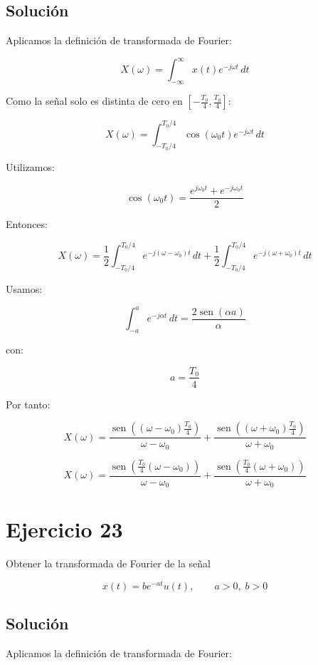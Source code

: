 \documentclass[fleqn]{article}
\DeclareMathOperator{\sen}{sen}
\begin{document}
	\subsection{Solución}

	Aplicamos la definición de transformada de Fourier:

	\[
	X(\omega)
	=
	\int_{-\infty}^{\infty}
	x(t)e^{-j\omega t}\,dt
	\]

	Como la señal solo es distinta de cero en
	$\left[-\frac{T_0}{4},\frac{T_0}{4}\right]$:

	\[
	X(\omega)
	=
	\int_{-T_0/4}^{T_0/4}
	\cos(\omega_0 t)e^{-j\omega t}\,dt
	\]

	Utilizamos:

	\[
	\cos(\omega_0 t)
	=
	\frac{
	e^{j\omega_0 t}
	+
	e^{-j\omega_0 t}
	}{2}
	\]

	Entonces:

	\[
	X(\omega)
	=
	\frac{1}{2}
	\int_{-T_0/4}^{T_0/4}
	e^{-j(\omega-\omega_0)t}\,dt
	+
	\frac{1}{2}
	\int_{-T_0/4}^{T_0/4}
	e^{-j(\omega+\omega_0)t}\,dt
	\]

	Usamos:

	\[
	\int_{-a}^{a}
	e^{-j\alpha t}\,dt
	=
	\frac{2\sen(\alpha a)}{\alpha}
	\]

	con:

	\[
	a=\frac{T_0}{4}
	\]

	Por tanto:

	\[
	X(\omega)
	=
	\frac{
	\sen\left(
	(\omega-\omega_0)\frac{T_0}{4}
	\right)
	}{
	\omega-\omega_0
	}
	+
	\frac{
	\sen\left(
	(\omega+\omega_0)\frac{T_0}{4}
	\right)
	}{
	\omega+\omega_0
	}
	\]

	\[
	\boxed{
	X(\omega)
	=
	\frac{
	\sen\left(
	\frac{T_0}{4}(\omega-\omega_0)
	\right)
	}{
	\omega-\omega_0
	}
	+
	\frac{
	\sen\left(
	\frac{T_0}{4}(\omega+\omega_0)
	\right)
	}{
	\omega+\omega_0
	}
	}
	\]

\section{Ejercicio 23}
	Obtener la transformada de Fourier de la señal

	\[
	x(t)=be^{-at}u(t),
	\qquad a>0,\; b>0
	\]

	\subsection{Solución}

	Aplicamos la definición de transformada de Fourier:
\end{document}
